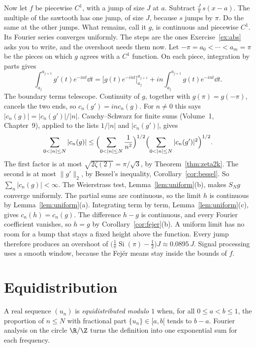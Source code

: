 Now let $f$ be piecewise $C^1$, with a jump of size $J$ at $a$. Subtract $\frac J\pi\, s(x-a)$. The multiple of the sawtooth has one jump, of size $J$, because $s$ jumps by $\pi$. Do the same at the other jumps. What remains, call it $g$, is continuous and piecewise $C^1$. Its Fourier series converges uniformly. The steps are the ones Exercise~\ref{ex:abs} asks you to write, and the overshoot needs them now. Let $-\pi=a_0<\cdots<a_m=\pi$ be the pieces on which $g$ agrees with a $C^1$ function. On each piece, integration by parts gives
\[
\int_{a_j}^{a_{j+1}}g'(t)e^{-int}\dd t=\bigl[g(t)e^{-int}\bigr]_{a_j}^{a_{j+1}}+in\int_{a_j}^{a_{j+1}}g(t)e^{-int}\dd t.
\]
The boundary terms telescope. Continuity of $g$, together with $g(\pi)=g(-\pi)$, cancels the two ends, so $c_n(g')=inc_n(g)$. For $n\ne0$ this says $|c_n(g)|=|c_n(g')|/|n|$. Cauchy--Schwarz for finite sums (Volume~1, Chapter~9), applied to the lists $1/|n|$ and $|c_n(g')|$, gives
\[
\sum_{0<|n|\le N}|c_n(g)|\le\Bigl(\sum_{0<|n|\le N}\frac1{n^2}\Bigr)^{1/2}\Bigl(\sum_{0<|n|\le N}|c_n(g')|^2\Bigr)^{1/2}.
\]
The first factor is at most $\sqrt{2\zeta(2)}=\pi/\sqrt3$, by Theorem~\ref{thm:zeta2k}. The second is at most $\|g'\|_2$, by Bessel's inequality, Corollary~\ref{cor:bessel}. So $\sum_n|c_n(g)|<\infty$. The Weierstrass test, Lemma~\ref{lem:uniform}(b), makes $S_Ng$ converge uniformly. The partial sums are continuous, so the limit $h$ is continuous by Lemma~\ref{lem:uniform}(a). Integrating term by term, Lemma~\ref{lem:uniform}(c), gives $c_n(h)=c_n(g)$. The difference $h-g$ is continuous, and every Fourier coefficient vanishes, so $h=g$ by Corollary~\ref{cor:fejer}(b). A uniform limit has no room for a bump that stays a fixed height above the function. Every jump therefore produces an overshoot of $\bigl(\frac1\pi\operatorname{Si}(\pi)-\frac12\bigr)J\approx0.0895\,J$. Signal processing uses a smooth window, because the Fej\'er means stay inside the bounds of $f$.

\section{Equidistribution}

A real sequence $(u_n)$ is \emph{equidistributed modulo $1$} when, for all $0\le a<b\le1$, the proportion of $n\le N$ with fractional part $\{u_n\}\in[a,b[$ tends to $b-a$. Fourier analysis on the circle $\R/\Z$ turns the definition into one exponential sum for each frequency.

